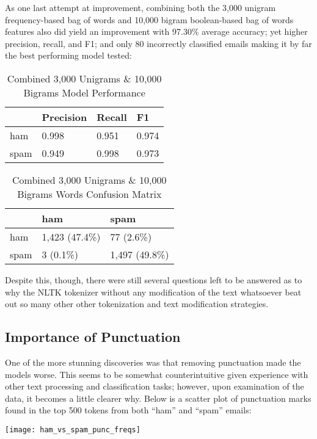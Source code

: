 \documentclass[a4paper]{article}
\begin{document}
	As one last attempt at improvement, combining both the 3,000 unigram frequency-based bag of words and 10,000 bigram boolean-based bag of words features also did yield an improvement with 97.30\% average accuracy; yet higher precision, recall, and F1; and only 80 incorrectly classified emails making it by far the best performing model tested:
	
	\begin{table}[H]
		\centering
		\caption{Combined 3,000 Unigrams \& 10,000 Bigrams Model Performance}
		\begin{tabular}{llll}
			     & Precision & Recall & F1 \\
			\hline
			ham  & 0.998 & 0.951 & 0.974 \\
			spam & 0.949 & 0.998 & 0.973
		\end{tabular}
	\end{table}

	\begin{table}[H]
		\centering
		\caption{Combined 3,000 Unigrams \& 10,000 Bigrams Words Confusion Matrix}
		\begin{tabular}{l|ll}
			& ham & spam \\
			\hline
			ham & 1,423 (47.4\%) & 77 (2.6\%) \\
			spam & 3 (0.1\%) & 1,497 (49.8\%)
		\end{tabular}
	\end{table}
	

	Despite this, though, there were still several questions left to be answered as to why the NLTK tokenizer without any modification of the text whatsoever beat out so many other other tokenization and text modification strategies.
	
	\subsection{Importance of Punctuation}
	
	One of the more stunning discoveries was that removing punctuation made the models worse. This seems to be somewhat counterintuitive given experience with other text processing and classification tasks; however, upon examination of the data, it becomes a little clearer why. Below is a scatter plot of punctuation marks found in the top 500 tokens from both “ham” and “spam” emails:
	
	\texttt{[image: ham\_vs\_spam\_punc\_freqs]}
	
\end{document}
